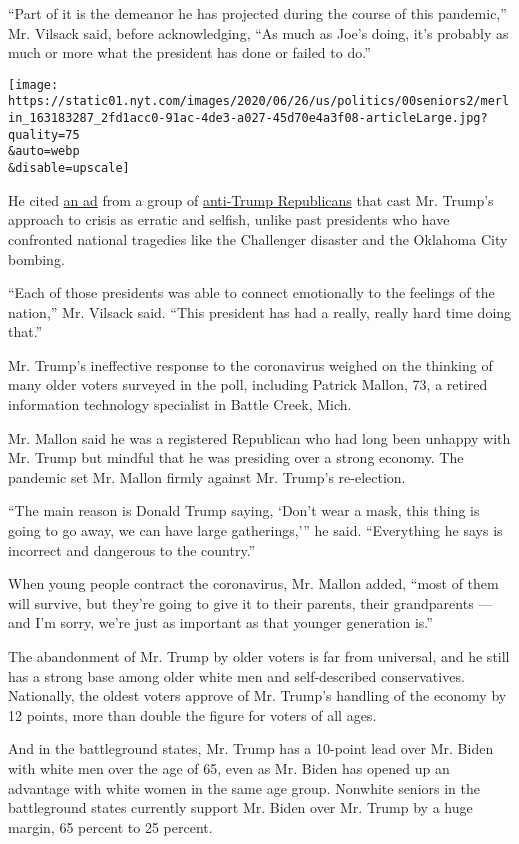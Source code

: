 ``Part of it is the demeanor he has projected during the course of this
pandemic,'' Mr. Vilsack said, before acknowledging, ``As much as Joe's
doing, it's probably as much or more what the president has done or
failed to do.''

\texttt{[image: https://static01.nyt.com/images/2020/06/26/us/politics/00seniors2/merlin\_163183287\_2fd1acc0-91ac-4de3-a027-45d70e4a3f08-articleLarge.jpg?quality=75\\\&auto=webp\\\&disable=upscale]}

He cited
\href{https://twitter.com/ProjectLincoln/status/1276112782187003904?s=20}{an
ad} from a group of
\href{https://www.nytimes.com/2019/12/17/opinion/lincoln-project.html}{anti-Trump
Republicans} that cast Mr. Trump's approach to crisis as erratic and
selfish, unlike past presidents who have confronted national tragedies
like the Challenger disaster and the Oklahoma City bombing.

``Each of those presidents was able to connect emotionally to the
feelings of the nation,'' Mr. Vilsack said. ``This president has had a
really, really hard time doing that.''

Mr. Trump's ineffective response to the coronavirus weighed on the
thinking of many older voters surveyed in the poll, including Patrick
Mallon, 73, a retired information technology specialist in Battle Creek,
Mich.

Mr. Mallon said he was a registered Republican who had long been unhappy
with Mr. Trump but mindful that he was presiding over a strong economy.
The pandemic set Mr. Mallon firmly against Mr. Trump's re-election.

``The main reason is Donald Trump saying, `Don't wear a mask, this thing
is going to go away, we can have large gatherings,''' he said.
``Everything he says is incorrect and dangerous to the country.''

When young people contract the coronavirus, Mr. Mallon added, ``most of
them will survive, but they're going to give it to their parents, their
grandparents --- and I'm sorry, we're just as important as that younger
generation is.''

The abandonment of Mr. Trump by older voters is far from universal, and
he still has a strong base among older white men and self-described
conservatives. Nationally, the oldest voters approve of Mr. Trump's
handling of the economy by 12 points, more than double the figure for
voters of all ages.

And in the battleground states, Mr. Trump has a 10-point lead over Mr.
Biden with white men over the age of 65, even as Mr. Biden has opened up
an advantage with white women in the same age group. Nonwhite seniors in
the battleground states currently support Mr. Biden over Mr. Trump by a
huge margin, 65 percent to 25 percent.


